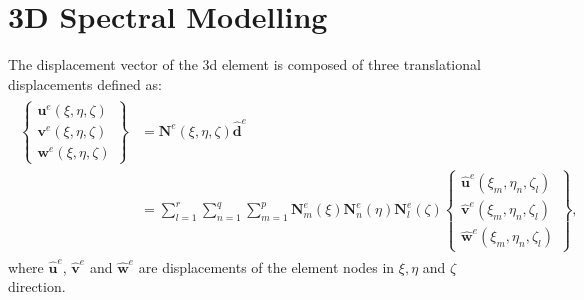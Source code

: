 \section{3D Spectral Modelling}
\label{sec:3Dmodel}

The displacement vector of the \ac{3d} element is composed of three translational displacements defined as:
\begin{eqnarray}
	\begin{split}
	\left \{ \begin{array}{c}
		\textbf{u}^e(\xi,\eta,\zeta) \\
		\textbf{v}^e(\xi,\eta,\zeta) \\
		\textbf{w}^e(\xi,\eta,\zeta)
	\end{array} \right\}
	& = \textbf{N}^e(\xi,\eta, \zeta)\widehat{\textbf{d}}^e\\
	& = \sum_{l=1}^r\sum_{n=1}^q\sum_{m=1}^p\textbf{N}_m^e(\xi)\textbf{N}_n^e(\eta)\textbf{N}_l^e(\zeta)
	\left \{ \begin{array}{c}
		\widehat{\textbf{u}}^e(\xi_m,\eta_n,\zeta_l) \\
		\widehat{\textbf{v}}^e(\xi_m,\eta_n,\zeta_l) \\
		\widehat{\textbf{w}}^e(\xi_m,\eta_n,\zeta_l)
	\end{array} \right\},
	\label{eq:3D_displ}
	\end{split}
\end{eqnarray}
where \(\widehat{\textbf{u}}^e\), \(\widehat{\textbf{v}}^e\) and 
\(\widehat{\textbf{w}}^e\) are displacements of the element nodes in \(\xi,\eta\) and \(\zeta\) direction.

